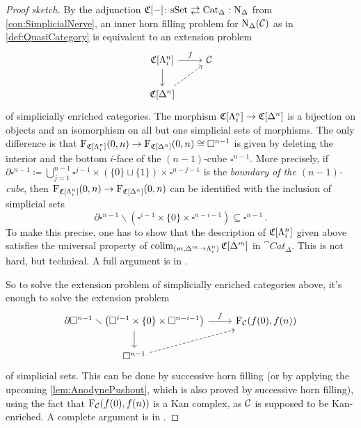 \begin{proof}[Proof sketch]
	By the adjunction $\CC[-]\colon\cat{sSet}\shortdoublelrmorphism\cat{Cat}_\Delta\noloc\N_\Delta$ from \cref{con:SimplicialNerve}, an inner horn filling problem for $\operatorname{N}_\Delta(\mathcal{C})$ as in \cref{def:QuasiCategory} is equivalent to an extension problem
	\begin{equation*}
		\begin{tikzcd}
			\CC[\Lambda_i^n]\rar["f"]\dar & \Cc\\
			\CC[\Delta^n]\urar[dashed]
		\end{tikzcd}
	\end{equation*}
	of simplicially enriched categories. The morphism $\mathfrak{C}[\Lambda_i^n]\rightarrow\mathfrak{C}[\Delta^n]$ is a bijection on objects and an isomorphism on all but one simplicial sets of morphisms. The only difference is that $\operatorname{F}_{\mathfrak{C}[\Lambda_i^n]}(0,n)\rightarrow\operatorname{F}_{\mathfrak{C}[\Delta^n]}(0,n)\cong \square^{n-1}$ is given by deleting the interior and the bottom $i$-face of the $(n-1)$-cube $\square^{n-1}$. More precisely, if $\partial \square^{n-1}\coloneqq \bigcup_{j=1}^{n-1}\square^{j-1}\times(\{0\}\sqcup\{1\})\times\square^{n-j-1}$ is the \emph{boundary of the $(n-1)$-cube}, then $\operatorname{F}_{\mathfrak{C}[\Lambda_i^n]}(0,n)\rightarrow\operatorname{F}_{\mathfrak{C}[\Delta^n]}(0,n)$ can be identified with the inclusion of simplicial sets
	\begin{equation*}
		\partial \square^{n-1}\smallsetminus \left(\square^{i-1}\times\{0\}\times\square^{n-i-1}\right)\subseteq \square^{n-1}\,.
	\end{equation*}
	To make this precise, one has to show that the description of $\mathfrak{C}[\Lambda_i^n]$ given above satisfies the universal property of $\operatorname*{colim}_{(m,\Delta^m\rightarrow\Lambda_i^n)}\mathfrak{C}[\Delta^m]$ in $\cat{Cat}_\Delta$. This is not hard, but technical. A full argument is in \cite[Lemma~1.2.69]{Land}.
	
	So to solve the extension problem of simplicially enriched categories above, it's enough to solve the extension problem
	\begin{equation*}
		\begin{tikzcd}
			\partial \square^{n-1}\smallsetminus \left(\square^{i-1}\times\{0\}\times\square^{n-i-1}\right)\rar["f"]\dar & \F_\Cc\lef(f(0),f(n)\righ)\\
			\square^{n-1}\urar[dashed]
		\end{tikzcd}
	\end{equation*}
	of simplicial sets. This can be done by successive horn filling (or by applying the upcoming \cref{lem:AnodynePushout}, which is also proved by successive horn filling), using the fact that $\F_\Cc\lef(f(0),f(n)\righ)$ is a Kan complex, as $\mathcal{C}$ is supposed to be Kan-enriched. A complete argument is in \cite[Lemma~1.2.70]{Land}.
\end{proof}
